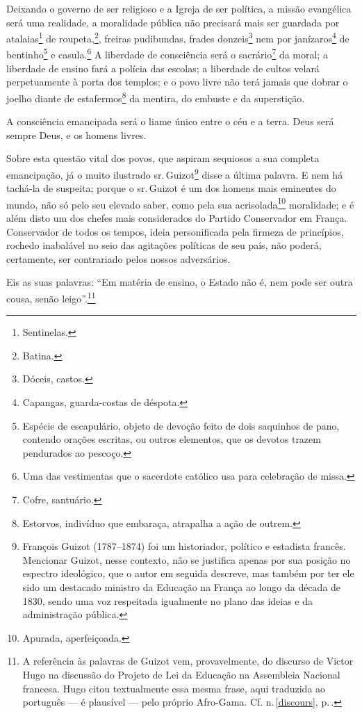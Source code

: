 Deixando o governo de ser religioso e a Igreja de ser política, a missão
evangélica será uma realidade, a moralidade pública não precisará mais
ser guardada por atalaias\footnote{Sentinelas.} de roupeta,\footnote{
  Batina.}, freiras pudibundas, frades donzeis\footnote{Dóceis,
  castos.} nem por janízaros\footnote{Capangas, guarda-costas de
  déspota.} de bentinho\footnote{Espécie de escapulário, objeto de
  devoção feito de dois saquinhos de pano, contendo orações escritas, ou
  outros elementos, que os devotos trazem pendurados ao pescoço.} e
casula.\footnote{Uma das vestimentas que o sacerdote católico usa para
  celebração de missa.} A liberdade de consciência será o
sacrário\footnote{Cofre, santuário.} da moral; a liberdade de ensino
fará a polícia das escolas; a liberdade de cultos velará perpetuamente à
porta dos templos; e o povo livre não terá jamais que dobrar o joelho
diante de estafermos\footnote{Estorvos, indivíduo que embaraça,
  atrapalha a ação de outrem.} da mentira, do embuste e da superstição.

A consciência emancipada será o liame único entre o céu e a terra. Deus
será sempre Deus, e os homens livres.

Sobre esta questão vital dos povos, que aspiram sequiosos a sua completa
emancipação, já o muito ilustrado sr.\,Guizot\footnote{François Guizot
  (1787--1874) foi um historiador, político e estadista francês.
  Mencionar Guizot, nesse contexto, não se justifica apenas por sua
  posição no espectro ideológico, que o autor em seguida descreve, mas
  também por ter ele sido um destacado ministro da Educação na França ao
  longo da década de 1830, sendo uma voz respeitada igualmente no plano
  das ideias e da administração pública.} disse a última palavra. E nem
há tachá-la de suspeita; porque o sr.\,Guizot é um dos homens mais
eminentes do mundo, não só pelo seu elevado saber, como pela sua
acrisolada\footnote{Apurada, aperfeiçoada.} moralidade; e é além disto
um dos chefes mais considerados do Partido Conservador em França.
Conservador de todos os tempos, ideia personificada pela firmeza de
princípios, rochedo inabalável no seio das agitações políticas de seu
país, não poderá, certamente, ser contrariado pelos nossos adversários.

Eis as suas palavras: ``Em matéria de ensino, o Estado não é, nem pode
ser outra cousa, senão leigo''.\footnote{A referência às palavras de
  Guizot vem, provavelmente, do discurso de Victor Hugo na discussão do
  Projeto de Lei da Educação na Assembleia Nacional francesa. Hugo citou
  textualmente essa mesma frase, aqui traduzida ao português --- é
  plausível --- pelo próprio Afro-Gama. Cf. n.\,\ref{discours}, p.\,\pageref{discours}.}

